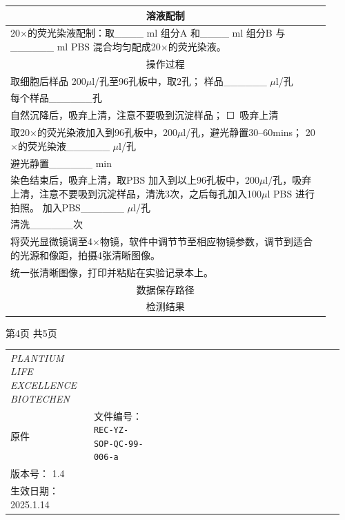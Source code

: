 \documentclass[UTF8,10pt,a4paper,fontset=fandol]{ctexart}
\newcommand{\fieldvalue}[1]{#1}
\newcommand{\checkboxfield}[1]{\ifstrequal{#1}{checked}{☑}{\ifstrequal{#1}{unclear}{?}{☐}}}
\begin{document}
\begin{tabular}{|p{0.92\linewidth}|}
\hline
\multicolumn{1}{|c|}{溶液配制} \\ \hline
20$\times$的荧光染液配制：取\_\_\_\_ ml 组分A 和\_\_\_\_ ml 组分B 与\_\_\_\_\_\_ ml PBS 混合均匀配成20$\times$的荧光染液。 \\ \hline
\multicolumn{1}{|c|}{操作过程} \\ \hline
取细胞后样品 200$\mu$l/孔至96孔板中，取2孔；
样品\_\_\_\_\_\_ $\mu$l/孔 \\
每个样品\_\_\_\_\_\_孔 \\ \hline
自然沉降后，吸弃上清，注意不要吸到沉淀样品；
\fieldvalue{\checkboxfield{unchecked}}\ 吸弃上清 \\ \hline
取20$\times$的荧光染液加入到96孔板中，200$\mu$l/孔，避光静置30--60mins；
20$\times$的荧光染液\_\_\_\_\_\_ $\mu$l/孔 \\
避光静置\_\_\_\_\_\_ min \\ \hline
染色结束后，吸弃上清，取PBS 加入到以上96孔板中，200$\mu$l/孔，吸弃上清，注意不要吸到沉淀样品，清洗3次，之后每孔加入100$\mu$l PBS 进行拍照。
加入PBS\_\_\_\_\_\_ $\mu$l/孔 \\
清洗\_\_\_\_\_\_次 \\ \hline
将荧光显微镜调至4$\times$物镜，软件中调节节至相应物镜参数，调节到适合的光源和像距，拍摄4张清晰图像。
\\ \hline
统一张清晰图像，打印并粘贴在实验记录本上。
\\ \hline
\multicolumn{1}{|c|}{数据保存路径} \\ \hline
\multicolumn{1}{|c|}{检测结果} \\ \hline
\end{tabular}

\vfill

\begin{center}
第4页 共5页
\end{center}

\newpage

\noindent
\begin{tabular}{@{}p{0.24\linewidth}p{0.18\linewidth}p{0.32\linewidth}p{0.22\linewidth}@{}}
\textit{PLANTIUM LIFE EXCELLENCE BIOTECHEN} &
\begin{center}
\scriptsize 蜀生生物\\[-1pt]
\fieldvalue{原件}
\end{center}
&
\centering
文件编号：
\fieldvalue{\texttt{REC-YZ-SOP-QC-99-006-a}}
&
\begin{center}
\scriptsize 蜀生生物\\[-1pt]
版本号：
\fieldvalue{1.4}\\[-1pt]
生效日期：
\fieldvalue{2025.1.14}
\end{center}
\end{tabular}
\end{document}
